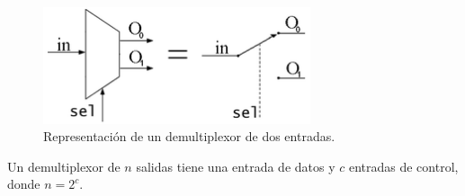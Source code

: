 \documentclass[a4paper, 11pt, titlepage]{article}
\begin{document}
		\begin{figure}[htp]
			\centering
			\includegraphics[width=0.7\textwidth]{resources/demultiplexor.png}
			\caption{Representación de un demultiplexor de dos entradas.}
			\label{demultiplexor}
		\end{figure}

		Un demultiplexor de $n$ salidas tiene una entrada de datos y $c$ entradas de control, donde $n=2^c$.
\end{document}
